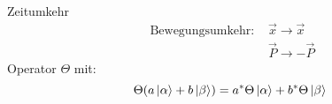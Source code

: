 \begin{mainbox}{Zeitumkehr}
    \begin{align*}
        \text{ Bewegungsumkehr: } & \vec{x} \rightarrow \vec{x} \\
        & \vec{P} \rightarrow -\vec{P}
    \end{align*}
Operator $\Theta$ mit:
\[ \Theta (a\ket{\alpha} + b \ket{\beta} ) = a^* \Theta \ket{\alpha} + b^* \Theta \ket{\beta} \]
\end{mainbox}